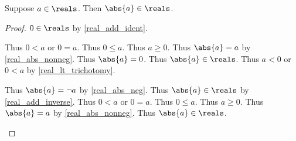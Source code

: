 \begin{lemma}\label{real_abs_in_reals}
    Suppose $a\in\reals$.
    Then $\abs{a}\in\reals$.
\end{lemma}
\begin{proof}
    $0\in\reals$ by \cref{real_add_ident}.
    \begin{byCase}
        Thus $0 < a$ or $0 = a$.
        Thus $0 \leq a$.
        Thus $a \geq 0$.
        Thus $\abs{a} = a$ by \cref{real_abs_nonneg}.
        Thus $\abs{a} = 0$.
        Thus $\abs{a}\in\reals$.
        Thus $a < 0$ or $0 < a$ by \cref{real_lt_trichotomy}.
        \begin{byCase}
            Thus $\abs{a} = \neg{a}$ by \cref{real_abs_neg}.
            Thus $\abs{a}\in\reals$ by \cref{real_add_inverse}.
            Thus $0 < a$ or $0 = a$.
            Thus $0 \leq a$.
            Thus $a \geq 0$.
            Thus $\abs{a} = a$ by \cref{real_abs_nonneg}.
            Thus $\abs{a}\in\reals$.
        \end{byCase}
    \end{byCase}
\end{proof}

